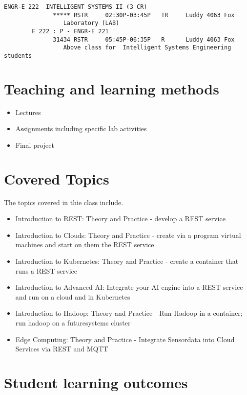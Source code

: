 \begin{verbatim}
ENGR-E 222  INTELLIGENT SYSTEMS II (3 CR)
              ***** RSTR     02:30P-03:45P   TR     Luddy 4063 Fox
                 Laboratory (LAB)
        E 222 : P - ENGR-E 221
              31434 RSTR     05:45P-06:35P   R      Luddy 4063 Fox
                 Above class for  Intelligent Systems Engineering students

\end{verbatim}        


\section{Teaching and learning methods}


\begin{itemize}
\item Lectures
\item Assignments including specific lab activities
\item Final project 
\end{itemize}

\section{Covered Topics}

The topics covered in thie class include.

\begin{itemize}
\item Introduction to REST: Theory and Practice - develop a REST service
\item Introduction to Clouds: Theory and Practice - create via a
  program virtual machines and start on them the REST service
\item Introduction to Kubernetes: Theory and Practice - create a
  container that runs a REST service
\item Introduction to Advanced AI: Integrate your AI engine into a
  REST service and run on a cloud and in Kubernetes 
\item Introduction to Hadoop: Theory and Practice - Run Hadoop in a
  container; run hadoop on a futuresystems cluster
\item Edge Computing: Theory and Practice - Integrate Sensordata into
  Cloud Services via REST and MQTT
\end{itemize}


\section{Student learning outcomes}

